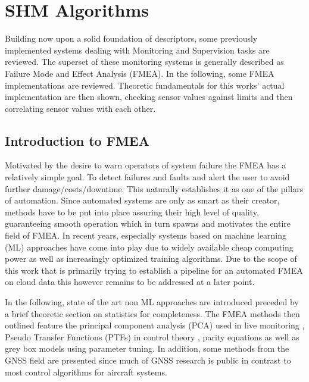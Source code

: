 

\section{SHM Algorithms}

Building now upon a solid foundation of descriptors, some previously implemented systems dealing with Monitoring and Supervision tasks are reviewed. The superset of these monitoring systems is generally described as Failure Mode and Effect Analysis (FMEA). In the following, some FMEA implementations are reviewed. Theoretic fundamentals for this works' actual implementation are then shown, checking sensor values against limits and then correlating sensor values with each other.

\subsection{Introduction to FMEA}

Motivated by the desire to warn operators of system failure the FMEA has a relatively simple goal. To detect failures and faults and alert the user to avoid further damage/costs/downtime. This naturally establishes it as one of the pillars of automation. \cite{isermann_fault-diagnosis_2006} Since automated systems are only as smart as their creator, methods have to be put into place assuring their high level of quality, guaranteeing smooth operation which in turn spawns and motivates the entire field of FMEA. In recent years, especially systems based on machine learning (ML) approaches have come into play due to widely available cheap computing power as well as increasingly optimized training algorithms. Due to the scope of this work that is primarily trying to establish a pipeline for an automated FMEA on cloud data this however remains to be addressed at a later point.


In the following, state of the art non ML approaches are introduced preceded by a brief theoretic section on statistics for completeness. The FMEA methods then outlined feature the principal component analysis (PCA) used in live monitoring \cite{xiao_diagnostic_2006}, Pseudo Transfer Functions (PTFs) in control theory \cite{aljanaideh_aircraft_2015}, parity equations as well as grey box models using parameter tuning. \cite{isermann_fault-diagnosis_2006} In addition, some methods from the GNSS field are presented since much of GNSS research is public in contrast to most control algorithms for aircraft systems.

